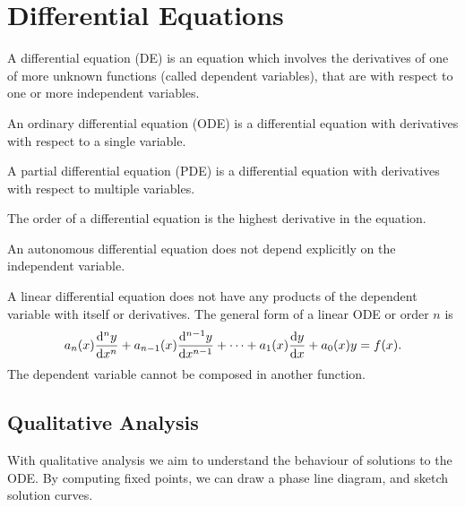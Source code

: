 \documentclass{article}
\begin{document}
\section{Differential Equations}
\begin{definition}
    A differential equation (DE) is an equation which involves the derivatives of
    one of more unknown functions (called dependent variables), that are with respect
    to one or more independent variables.
\end{definition}
\begin{definition}
    An ordinary differential equation (ODE) is a differential equation with
    derivatives with respect to a single variable.
\end{definition}
\begin{definition}
    A partial differential equation (PDE) is a differential equation with
    derivatives with respect to multiple variables.
\end{definition}
\begin{definition}
    The order of a differential equation is the highest derivative in the equation.
\end{definition}
\begin{definition}
    An autonomous differential equation does not depend explicitly on the independent variable.
\end{definition}
\begin{definition}
    A linear differential equation does not have any products of the dependent variable with itself
    or derivatives. The general form of a linear ODE or order $n$ is
    \begin{equation*}
        a_n(x)\dv[n]{y}{x} + a_{n-1}(x)\dv[n-1]{y}{x} + \cdots + a_1(x)\dv{y}{x} + a_0(x)y = f(x).
    \end{equation*}
    The dependent variable cannot be composed in another function.
\end{definition}
\subsection{Qualitative Analysis}
With qualitative analysis we aim to understand the behaviour of solutions to the ODE.
By \linebreak computing fixed points, we can draw a phase line diagram, and sketch solution curves.
\end{document}
